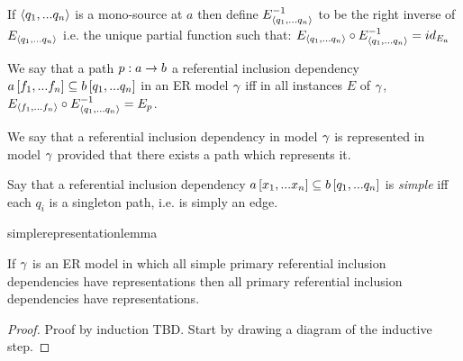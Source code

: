 If $\langle q_1,...q_n\rangle$ is a mono-source at $a$ then define $E_{\langle q_1,...q_n\rangle}^{-1}$ to be the right inverse of
$E_{\langle q_1,...q_n\rangle}$ i.e. the unique partial function such that:
$E_{\langle q_1,...q_n\rangle} \circ E_{\langle q_1,...q_n\rangle}^{-1} = id_{E_a}$

\begin{definition}
We say that a path $p:a \rightarrow b$  a referential inclusion dependency
$a\left[f_1,...f_n\right]\subseteq b\left[q_1,...q_n\right]$  in an ER model $\gamma$ iff
  in all instances $E$ of $\gamma$, $E_{\langle f_1,...f_n\rangle} \circ E_{\langle q_1,...q_n\rangle}^{-1}=E_p$.
\end{definition}
We say that a referential inclusion dependency in model $\gamma$ is represented in model $\gamma$ provided that there exists a path which represents it. 

\iffalse
\begin{categoricalaside}
If an ER schema is represented as a category with finite products (\textit{a la} Johnstone \textit{et al}) then
a referential inclusion dependency is a diagram
\begin{center}
$
\begin{array}{cp{0.75cm}c}
   \Rnode{a}{a}     & & \Rnode{x}{x}  \\[1.2cm]     
	                  & & \Rnode{b}{b}  
\end{array}
$
\ncarr{a}{x} 
\alabel{f}[0.33]
\ncarr{b}{x}
\blabel{m}[0.3]
\idcomp
\end{center}
\noindent
in \cat{C} such that in all instance functors $F$, 
$F(f)$ factors through $F(m)$.

Such a referential inclusion dependency is explicitly represented iff
 $f$ factors through $m$ i.e. there is an $f_0: a \morph b$ in \cat{C} such that 
$f_0 \circ m =f$. Note that because $m$ is monic then such an $f_0$ is the unique such morphism and if in some instance $F$,
$e: F(a) \morph F(b)$ is a function such that $e \circ F(m) = F(f)$ then $F(f_0)=e$. 
\end{categoricalaside}
\fi


\begin{definition}
Say that a referential inclusion dependency $a\left[x_1,...x_n\right]\subseteq b\left[q_1,...q_n\right]$ is \textit{simple}
iff each $q_i$ is a singleton path, i.e. is simply an edge. 
\end{definition}

simplerepresentationlemma
\begin{lemma}
\label{simplerepresentationlemma}
If  $\gamma$ is an ER model in which all simple primary referential inclusion dependencies
have representations then all primary referential inclusion dependencies have representations. 
\end{lemma}
\begin{proof}
Proof by induction TBD. Start by drawing a diagram of the inductive step.
\end{proof}



